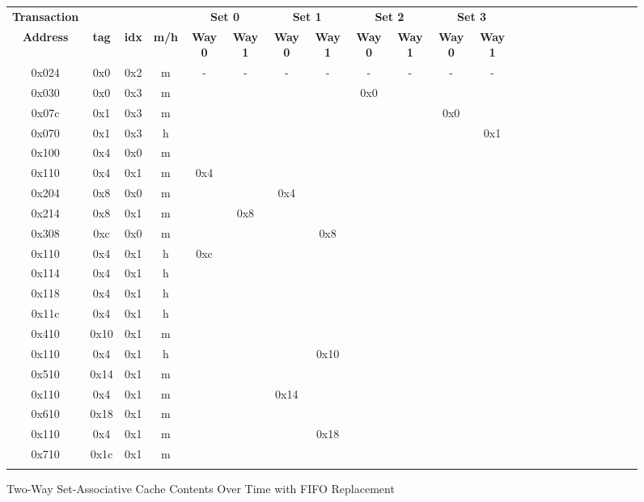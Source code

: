 \documentclass[10pt]{article}
\begin{document}
\begin{figure}[H]
\centering
\begin{tabular}{@{\extracolsep{3pt}}cccccccccccc@{}}
\Xhline{2\arrayrulewidth}
\textbf{Transaction} & & & & \multicolumn{2}{c}{\textbf{Set 0}} & \multicolumn{2}{c}{\textbf{Set 1}} & \multicolumn{2}{c}{\textbf{Set 2}} & \multicolumn{2}{c}{\textbf{Set 3}} \\
\cline{5-6}
\cline{7-8}
\cline{9-10}
\cline{11-12}
\textbf{Address} & \textbf{tag} & \textbf{idx} & \textbf{m/h} & \textbf{Way 0} & \textbf{Way 1} & \textbf{Way 0} & \textbf{Way 1} & \textbf{Way 0} & \textbf{Way 1} & \textbf{Way 0} & \textbf{Way 1} \\
\Xhline{2\arrayrulewidth}
0x024 & 0x0 & 0x2 & m &  -  &  -  &  -  &  -  &  -  &  -  &  -  &  -  \\
0x030 & 0x0 & 0x3 & m &     &     &     &     & 0x0 &     &     &     \\
0x07c & 0x1 & 0x3 & m &     &     &     &     &     &     & 0x0 &     \\
0x070 & 0x1 & 0x3 & h &     &     &     &     &     &     &     & 0x1 \\
0x100 & 0x4 & 0x0 & m &     &     &     &     &     &     &     &     \\
0x110 & 0x4 & 0x1 & m & 0x4 &     &     &     &     &     &     &     \\
0x204 & 0x8 & 0x0 & m &     &     & 0x4 &     &     &     &     &     \\
0x214 & 0x8 & 0x1 & m &     & 0x8 &     &     &     &     &     &     \\
0x308 & 0xc & 0x0 & m &     &     &     & 0x8 &     &     &     &     \\
0x110 & 0x4 & 0x1 & h & 0xc &     &     &     &     &     &     &     \\
0x114 & 0x4 & 0x1 & h &     &     &     &     &     &     &     &     \\
0x118 & 0x4 & 0x1 & h &     &     &     &     &     &     &     &     \\
0x11c & 0x4 & 0x1 & h &     &     &     &     &     &     &     &     \\
0x410 & 0x10& 0x1 & m &     &     &     &     &     &     &     &     \\
0x110 & 0x4 & 0x1 & h &     &     &     & 0x10&     &     &     &     \\
0x510 & 0x14& 0x1 & m &     &     &     &     &     &     &     &     \\
0x110 & 0x4 & 0x1 & m &     &     & 0x14&     &     &     &     &     \\
0x610 & 0x18& 0x1 & m &     &     &     &     &     &     &     &     \\
0x110 & 0x4 & 0x1 & m &     &     &     & 0x18&     &     &     &     \\
0x710 & 0x1c& 0x1 & m &     &     &     &     &     &     &     &     \\
\Xhline{2\arrayrulewidth}
\multicolumn{12}{l}{\textbf{Number of Misses = 14}}
\hline
\multicolumn{12}{l}{\textbf{Miss Rate = 0.7}}
\Xhline{2\arrayrulewidth}
\end{tabular}
\caption{Two-Way Set-Associative Cache Contents Over Time with FIFO Replacement}
\end{figure}
\end{document}
